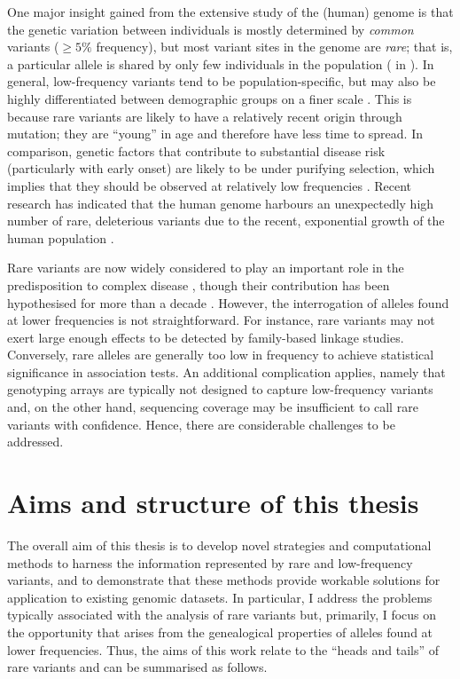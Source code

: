 One major insight gained from the extensive study of the (human) genome is that the genetic variation between individuals is mostly determined by \emph{common} variants (\eg ${\geq 5\%}$ frequency), but most variant sites in the genome are \emph{rare}; that is, a particular allele is shared by only few individuals in the population ( in ).
In general, low-frequency variants tend to be population-specific, but may also be highly differentiated between demographic groups on a finer scale \citep{Gravel:2011bgb,Bustamante:2011df,Mathieson:2014ig}.
This is because rare variants are likely to have a relatively recent origin through mutation; \ie they are ``young'' in age and therefore have less time to spread.
In comparison, genetic factors that contribute to substantial disease risk (particularly with early onset) are likely to be under purifying selection, which implies that they should be observed at relatively low frequencies \citep{Kryukov:2007ec,Marth:2011bz}.
Recent research has indicated that the human genome harbours an unexpectedly high number of rare, deleterious variants due to the recent, exponential growth of the human population \citep{Coventry:2010cqa,Keinan:2012kl,Tennessen:2012ck}.

Rare variants are now widely considered to play an important role in the predisposition to complex disease \citep{Bodmer:2008ep,Schork:2009ke,Manolio:2009jp,McClellan:2010ksa,Cirulli:2010cza}, though their contribution has been hypothesised for more than a decade \citep{Pritchard:2001hw}.
However, the interrogation of alleles found at lower frequencies is not straightforward.
For instance, rare variants may not exert large enough effects to be detected by family-based linkage studies.
Conversely, rare alleles are generally too low in frequency to achieve statistical significance in association tests.
An additional complication applies, namely that genotyping arrays are typically not designed to capture low-frequency variants and, on the other hand, sequencing coverage may be insufficient to call rare variants with confidence.
Hence, there are considerable challenges to be addressed.


%
\section{Aims and structure of this thesis}
%

The overall aim of this thesis is to develop novel strategies and computational methods to harness the information represented by rare and low-frequency variants, and to demonstrate that these methods provide workable solutions for application to existing genomic datasets.
In particular, I address the problems typically associated with the analysis of rare variants but, primarily, I focus on the opportunity that arises from the genealogical properties of alleles found at lower frequencies.
Thus, the aims of this work relate to the ``heads and tails'' of rare variants and can be summarised as follows.

